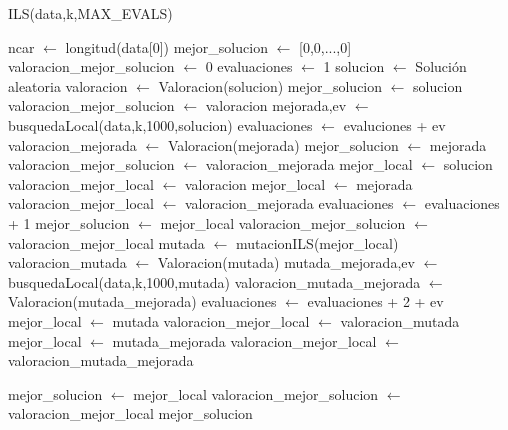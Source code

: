 \documentclass[12pt,a4paper]{article}
\begin{document}
	\begin{algorithm}
		\caption{ILS(data,k,MAX\_EVALS)}
		\begin{algorithmic}			
			\STATE ncar $\leftarrow$ longitud(data[0])
			\STATE mejor\_solucion $\leftarrow$ [0,0,...,0]
			\STATE valoracion\_mejor\_solucion $\leftarrow$ 0
			\STATE evaluaciones $\leftarrow$ 1
				\STATE solucion $\leftarrow$ Solución aleatoria
				\STATE valoracion $\leftarrow$ Valoracion(solucion)
					\STATE mejor\_solucion $\leftarrow$ solucion
					\STATE valoracion\_mejor\_solucion $\leftarrow$ valoracion
				\ENDIF
				\STATE mejorada,ev $\leftarrow$ busquedaLocal(data,k,1000,solucion)
				\STATE evaluaciones $\leftarrow$ evaluciones + ev
				\STATE valoracion\_mejorada $\leftarrow$ Valoracion(mejorada)
					\STATE mejor\_solucion $\leftarrow$ mejorada
					\STATE valoracion\_mejor\_solucion $\leftarrow$ valoracion\_mejorada
				\ENDIF
					\STATE mejor\_local $\leftarrow$ solucion
					\STATE valoracion\_mejor\_local $\leftarrow$ valoracion
				\ELSE
					\STATE mejor\_local $\leftarrow$ mejorada
					\STATE valoracion\_mejor\_local $\leftarrow$ valoracion\_mejorada
				\ENDIF
				\STATE evaluaciones $\leftarrow$ evaluaciones + 1
					\STATE mejor\_solucion $\leftarrow$ mejor\_local
					\STATE valoracion\_mejor\_solucion $\leftarrow$ valoracion\_mejor\_local
				\ENDIF
					\STATE mutada $\leftarrow$ mutacionILS(mejor\_local)
					\STATE valoracion\_mutada $\leftarrow$ Valoracion(mutada)
					\STATE mutada\_mejorada,ev $\leftarrow$ busquedaLocal(data,k,1000,mutada)
					\STATE valoracion\_mutada\_mejorada $\leftarrow$ Valoracion(mutada\_mejorada)
					\STATE evaluaciones $\leftarrow$ evaluaciones + 2 + ev
						\STATE mejor\_local $\leftarrow$ mutada
						\STATE valoracion\_mejor\_local $\leftarrow$ valoracion\_mutada
					\ELSE
						\STATE mejor\_local $\leftarrow$ mutada\_mejorada
						\STATE valoracion\_mejor\_local $\leftarrow$ valoracion\_mutada\_mejorada
					\ENDIF
					
						\STATE mejor\_solucion $\leftarrow$ mejor\_local
						\STATE valoracion\_mejor\_solucion $\leftarrow$ valoracion\_mejor\_local
					\ENDIF
				\ENDFOR
			\ENDWHILE
			\RETURN mejor\_solucion
			
		\end{algorithmic}
	\end{algorithm}
	
\end{document}
